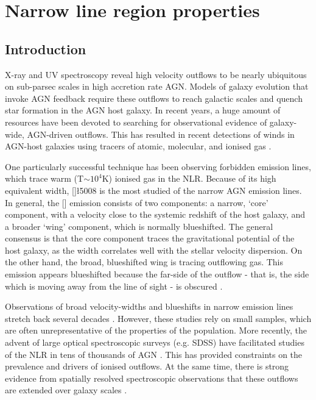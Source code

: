 
\chapter{Narrow line region properties}
\label{ch:nlr} 

\section{Introduction}

X-ray and \ac{UV} spectroscopy reveal high velocity outflows to be nearly ubiquitous on sub-parsec scales in high accretion rate \ac{AGN}.
Models of galaxy evolution that invoke \ac{AGN} feedback require these outflows to reach galactic scales and quench star formation in the \ac{AGN} host galaxy. 
In recent years, a huge amount of resources have been devoted to searching for observational evidence of galaxy-wide, \ac{AGN}-driven outflows. 
This has resulted in recent detections of winds in \ac{AGN}-host galaxies using tracers of atomic, molecular, and ionised gas \citep[e.g.][]{nesvadba06,arav08,nesvadba08,moe09,dunn10,alexander10,harrison12,harrison14,nesvadba10,rupke13,veilleux13,nardini15,feruglio10,alatalo11,cimatti13,cicone14}.  

One particularly successful technique has been observing forbidden emission lines, which trace warm (T$\sim$$10^4$K) ionised gas in the \ac{NLR}. 
Because of its high equivalent width, []\l5008 is the most studied of the narrow \ac{AGN} emission lines. 
In general, the [] emission consists of two components: a narrow, `core' component, with a velocity close to the systemic redshift of the host galaxy, and a broader `wing' component, which is normally blueshifted. 
The general consensus is that the core component traces the gravitational potential of the host galaxy, as the width correlates well with the stellar velocity dispersion. 
On the other hand, the broad, blueshifted wing is tracing outflowing gas. 
This emission appears blueshifted because the far-side of the outflow - that is, the side which is moving away from the line of sight - is obscured \citep[e.g.][]{heckman81,vrtilek85}. 

Observations of broad velocity-widths and blueshifts in narrow emission lines stretch back several decades \citep[e.g.][]{weedman70,stockton76,heckman81,veron81,feldman82,heckman84,vrtilek85,whittle85,boroson92}. 
However, these studies rely on small samples, which are often unrepresentative of the properties of the population. 
More recently, the advent of large optical spectroscopic surveys (e.g. \ac{SDSS}) have facilitated studies of the \ac{NLR} in tens of thousands of \ac{AGN} \citep[e.g.][]{boroson05,greene05a,zhang11,mullaney13,zakamska14,shen14}. 
This has provided constraints on the prevalence and drivers of ionised outflows.   
At the same time, there is strong evidence from spatially resolved spectroscopic observations that these outflows are extended over galaxy scales \citep[e.g.][]{greene09,greene11,hainline13,harrison12,harrison14}. 


